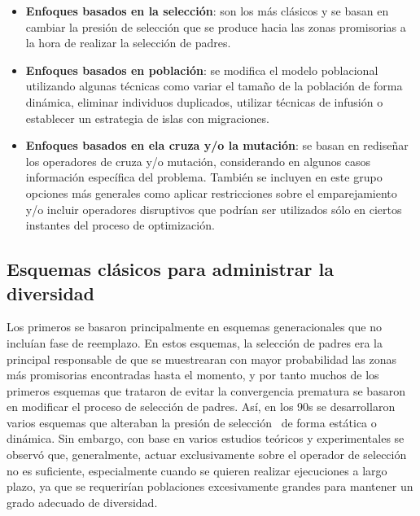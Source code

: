 \begin{itemize}
\item \textbf{Enfoques basados en la selección}: son los más clásicos y se basan en cambiar la presión de selección que se produce hacia las zonas promisorias a la hora de realizar
la selección de padres.
\item \textbf{Enfoques basados en población}: se modifica el modelo poblacional utilizando algunas técnicas como variar el tamaño de la población de forma
dinámica, eliminar individuos duplicados, utilizar técnicas de infusión o establecer un estrategia de islas con migraciones.
\item \textbf{Enfoques basados en ela cruza y/o la mutación}: se basan en rediseñar los operadores de cruza y/o mutación, considerando en algunos casos información específica del problema. También se incluyen en este grupo opciones más generales como aplicar restricciones sobre el emparejamiento y/o incluir operadores disruptivos que podrían ser utilizados sólo en ciertos instantes del proceso
de optimización.
\end{itemize}


\subsection{Esquemas clásicos para administrar la diversidad}

Los primeros \EAS{} se basaron principalmente en esquemas generacionales que no incluían fase de reemplazo.
%
En estos esquemas, la selección de padres era la principal responsable de que se muestrearan con mayor probabilidad las zonas
más promisorias encontradas hasta el momento, y por tanto muchos de los primeros esquemas que trataron de evitar la convergencia 
prematura se basaron en modificar el proceso de selección de padres.
%
Así, en los 90s se desarrollaron varios esquemas que alteraban la presión de selección~\cite{eiben2003introduction}
de forma estática o dinámica.
%
Sin embargo, con base en varios estudios teóricos y experimentales se observó que, generalmente, actuar exclusivamente sobre el operador de selección no es suficiente, especialmente
cuando se quieren realizar ejecuciones a largo plazo, ya que se requerirían poblaciones excesivamente grandes para mantener un grado adecuado de diversidad.

